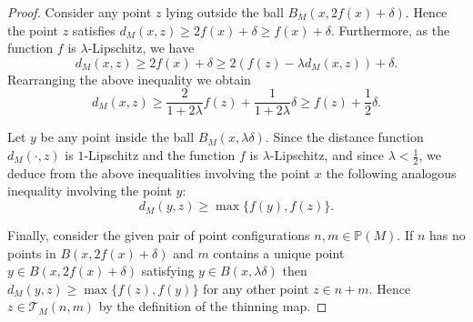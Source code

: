 \documentclass{amsart}
\newcommand{\Points}{\mathbb{P}}
\theoremstyle{plain}
\numberwithin{equation}{section}
\theoremstyle{definition}
\begin{document}
\begin{proof} 
Consider any point $z$ lying outside the ball $B_M(x,2f(x)+\delta)$. Hence the point $z$  satisfies $d_M(x,z) \ge 2f(x) + \delta \ge f(x) + \delta$. Furthermore, as the function $f$ is $\lambda$-Lipschitz, we have
$$d_M(x,z) \ge 2f(x) + \delta \ge 2(f(z) - \lambda d_M(x,z)) + \delta.$$
Rearranging the above inequality we obtain
$$ d_M(x,z) \ge \frac{2}{1+2\lambda} f(z) + \frac{1}{1+2\lambda} \delta \ge f(z) + \frac{1}{2} \delta.$$

Let $y$ be any point inside  the ball $B_M(x,\lambda \delta)$. Since the distance function $d_M(\cdot,z)$ is $1$-Lipschitz and the function $f$ is $\lambda$-Lipschitz, and since $\lambda<\frac{1}{2}$, we deduce from the above inequalities involving the point $x$ the following analogous inequality involving the point $y$:
$$ d_M(y,z) \ge \max \{f(y),f(z)\}.$$

Finally, consider the given pair of point configurations  $n,m \in \Points(M)$. If 
 $n$ has no points in $B(x,2f(x)+\delta)$ and $m$ contains a unique point $y\in B(x,2 f(x) + \delta )$ satisfying $y \in B(x,\lambda \delta )$ then  $d_M(y,z) \ge \max\{f(z),f(y)\}$ for any other point $z \in n + m$.  Hence $z\in \mathcal{T}_M(n,m)$ by the definition of the thinning map.
\end{proof}
\end{document}
